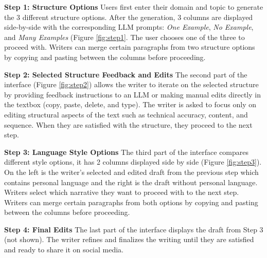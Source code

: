 \textbf{Step 1: Structure Options} Users first enter their domain and topic to generate the 3 different structure options. After the generation, 3 columns are displayed side-by-side with the corresponding LLM prompts: \textit{One Example}, \textit{No Example}, and \textit{Many Examples} (Figure \ref{fig:step1}. The user chooses one of the three to proceed with. Writers can merge certain paragraphs from two structure options by copying and pasting between the columns before proceeding. 

\textbf{Step 2: Selected Structure Feedback and Edits} The second part of the interface (Figure \ref{fig:step2}) allows the writer to iterate on the selected structure by providing feedback instructions to an LLM or making manual edits directly in the textbox (copy, paste, delete, and type). The writer is asked to focus only on editing structural aspects of the text such as technical accuracy, content, and sequence. When they are satisfied with the structure, they proceed to the next step. 


\textbf{Step 3: Language Style Options} The third part of the interface compares different style options, it has 2 columns displayed side by side (Figure \ref{fig:step3}). On the left is the writer's selected and edited draft from the previous step which contains personal language and the right is the draft without personal language. Writers select which narrative they want to proceed with to the next step. Writers can merge certain paragraphs from both options by copying and pasting between the columns before proceeding. 


\textbf{Step 4: Final Edits}
The last part of the interface displays the draft from Step 3 (not shown). The writer refines and finalizes the writing until they are satisfied and ready to share it on social media. 









